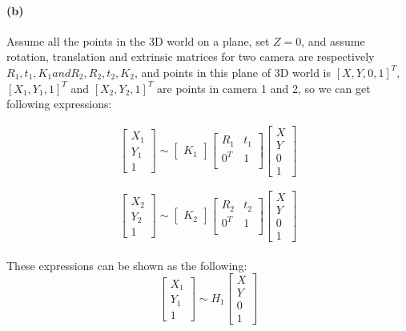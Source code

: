 \documentclass{article}
\newcommand{\spart}[1]{\paragraph{(#1)}}
\begin{document}
\spart{b}
Assume all the points in the 3D world on a plane, set $Z = 0$, and assume rotation, translation and extrinsic matrices for two camera are respectively $R_1, t_1, K_1 and R_2, R_2, t_2, K_2$, and points in this plane of 3D world is $[X, Y, 0, 1]^T$, $[X_1, Y_1, 1]^T$ and $[X_2, Y_2, 1]^T$ are points in camera 1 and 2, so we can get following expressions:

\begin{align}
	\left[
		\begin{array}{c}
		X_1 \\ Y_1 \\ 1
		\end{array}
	\right] 
	\sim
	\left[
		\begin{array}{c}
		K_1
		\end{array}
	\right]
	\left[
		\begin{array}{cc}
		R_1 & t_1\\
		0^T & 1\\
		\end{array}
	\right]
	\left[
		\begin{array}{c}
		X\\
		Y\\
		0\\
		1
		\end{array}
	\right]
\end{align}

\begin{equation}
	\left[
		\begin{array}{c}
		X_2 \\ Y_2 \\ 1
		\end{array}
	\right] 
	\sim
	\left[
		\begin{array}{c}
		K_2
		\end{array}
	\right]
	\left[
		\begin{array}{cc}
		R_2 & t_2\\
		0^T & 1\\
		\end{array}
	\right]
	\left[
		\begin{array}{c}
		X\\
		Y\\
		0\\
		1
		\end{array}
	\right]
\end{equation}
\\These expressions can be shown as the following:
\begin{equation}
	\left[
		\begin{array}{c}
		X_1 \\ Y_1 \\ 1
		\end{array}
	\right] 
	\sim
	H_1
	\left[
		\begin{array}{c}
		X\\
		Y\\
		0\\
		1
		\end{array}
	\right]
\end{equation}
\end{document}
